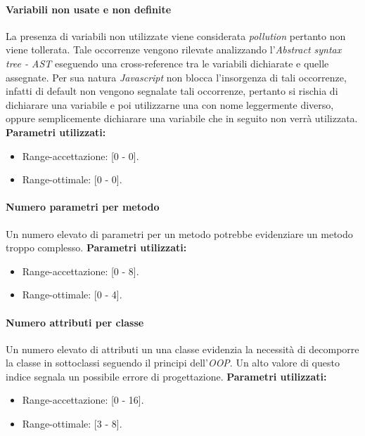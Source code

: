 			\paragraph{Variabili non usate e non definite}
			La presenza di variabili non utilizzate viene considerata \emph{pollution} pertanto non viene tollerata. Tale occorrenze vengono rilevate analizzando l'\emph{Abstract syntax tree - AST} eseguendo una cross-reference tra le variabili dichiarate e quelle assegnate. Per sua natura \emph{Javascript} non blocca l'insorgenza di tali occorrenze, infatti di default non vengono segnalate tali occorrenze, pertanto si rischia  di dichiarare una variabile e poi utilizzarne una con nome leggermente diverso, oppure semplicemente dichiarare una variabile che in seguito non verrà utilizzata.
			\textbf{Parametri utilizzati:}
			\begin{itemize}
				\item Range-accettazione: [0 - 0].
				\item Range-ottimale: [0 - 0].
			\end{itemize}
			
			\paragraph{Numero parametri per metodo}
			Un numero elevato di parametri per un metodo potrebbe evidenziare un metodo troppo complesso.
			\textbf{Parametri utilizzati:}
			\begin{itemize}
				\item Range-accettazione: [0 - 8].
				\item Range-ottimale: [0 - 4].
			\end{itemize}
			
			\paragraph{Numero attributi per classe}
			Un numero elevato di attributi un una classe evidenzia la necessità di decomporre la classe in sottoclassi seguendo il principi dell'\emph{OOP}. Un alto valore di questo indice segnala un possibile errore di progettazione.
			\textbf{Parametri utilizzati:}
			\begin{itemize}
				\item Range-accettazione: [0 - 16].
				\item Range-ottimale: [3 - 8].
			\end{itemize}
			
